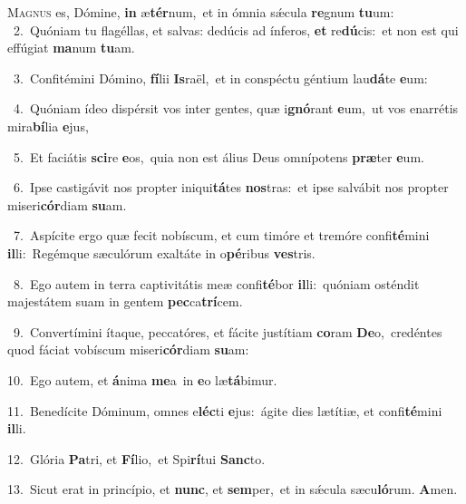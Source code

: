 \lettrine{\initial\textcolor{\initialcolor}{M}}{agnus} es, Dómine, \textbf{in} æ\-\textbf{tér}\-num,~\star et in ómnia sǽcula \textbf{re}\-gnum \textbf{tu}\-um:\\
{\numbfont\textcolor{\numbcolor}{~2.}}~Quóniam tu flagéllas, et salvas: dedúcis ad ínferos, \textbf{et} re\-\textbf{dú}\-cis:~\star et non est qui effúgiat \textbf{ma}\-num \textbf{tu}\-am.\par
{\numbfont\textcolor{\numbcolor}{~3.}}~Confitémini Dómino, \textbf{fí}\-lii \textbf{Is}\-raël,~\star et in conspéctu géntium lau\-\textbf{dá}\-te \textbf{e}\-um:\par
{\numbfont\textcolor{\numbcolor}{~4.}}~Quóniam ídeo dispérsit vos inter gentes, quæ i\-\textbf{gnó}\-rant \textbf{e}\-um,~\star ut vos enarrétis mira\-\textbf{bí}\-lia \textbf{e}\-jus,\par
{\numbfont\textcolor{\numbcolor}{~5.}}~Et faciátis \textbf{sci}\-re \textbf{e}\-os,~\star quia non est álius Deus omnípotens \textbf{præ}\-ter \textbf{e}\-um.\par
{\numbfont\textcolor{\numbcolor}{~6.}}~Ipse castigávit nos propter iniqui\-\textbf{tá}\-tes \textbf{nos}\-tras:~\star et ipse salvábit nos propter miseri\-\textbf{cór}\-diam \textbf{su}\-am.\par
{\numbfont\textcolor{\numbcolor}{~7.}}~Aspícite ergo quæ fecit nobíscum, et cum timóre et tremóre confi\-\textbf{té}\-mini \textbf{il}\-li:~\star Regémque sæculórum exaltáte in o\-\textbf{pé}\-ribus \textbf{ves}\-tris.\par
{\numbfont\textcolor{\numbcolor}{~8.}}~Ego autem in terra captivitátis meæ confi\-\textbf{té}\-bor \textbf{il}\-li:~\star quóniam osténdit majestátem suam in gentem \textbf{pec}\-ca\-\textbf{trí}\-cem.\par
{\numbfont\textcolor{\numbcolor}{~9.}}~Convertímini ítaque, peccatóres, et fácite justítiam \textbf{co}\-ram \textbf{De}\-o,~\star credéntes quod fáciat vobíscum miseri\-\textbf{cór}\-diam \textbf{su}\-am:\par
{\numbfont\textcolor{\numbcolor}{10.}}~Ego autem, et \textbf{á}\-nima \textbf{me}\-a~\star in \textbf{e}\-o læ\-\textbf{tá}\-bimur.\par
{\numbfont\textcolor{\numbcolor}{11.}}~Benedícite Dóminum, omnes e\-\textbf{léc}\-ti \textbf{e}\-jus:~\star ágite dies lætítiæ, et confi\-\textbf{té}\-mini \textbf{il}\-li.\par
{\numbfont\textcolor{\numbcolor}{12.}}~Glória \textbf{Pa}\-tri, et \textbf{Fí}\-lio,~\star et Spi\-\textbf{rí}\-tui \textbf{Sanc}\-to.\par
{\numbfont\textcolor{\numbcolor}{13.}}~Sicut erat in princípio, et \textbf{nunc}\-, et \textbf{sem}\-per,~\star et in sǽcula sæcu\-\textbf{ló}\-rum. \textbf{A}\-men.\par
